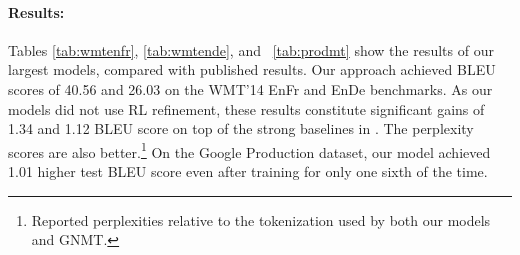 \documentclass{article} \pdfoutput=1
\begin{document}
\begin{table}[h!]
\caption{Results on WMT'14 En  De newstest2014 (bold values represent best results).}
\label{tab:wmtende}
\begin{center}
\vspace{-5pt}
\end{center}
\end{table}

\begin{table}[h!]
\caption{Results on the Google Production En Fr dataset (bold values represent best results).}
\label{tab:prodmt}
\begin{center}
\vspace{-5pt}
\end{center}
\end{table}

\paragraph{Results:} Tables \ref{tab:wmtenfr}, \ref{tab:wmtende}, and ~\ref{tab:prodmt} show the results of our largest models, compared with published results.  Our approach achieved BLEU scores of 40.56 and 26.03 on the  WMT'14 EnFr and EnDe benchmarks. As our models did not use RL refinement, these results constitute significant gains of 1.34 and 1.12 BLEU score on top of the strong baselines in \citep{GNMT}. The perplexity scores are also better.\footnote{Reported perplexities relative to the tokenization used by both our models and GNMT.} On the Google Production dataset, our model achieved 1.01 higher test BLEU score even after training for only one sixth of the time.
\end{document}
